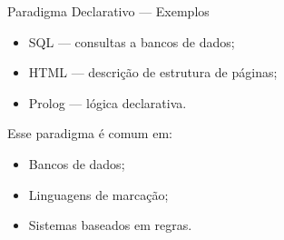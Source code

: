 \documentclass[9pt]{beamer}
\begin{document}
\begin{frame}{Paradigma Declarativo — Exemplos}
\begin{itemize}
  \item SQL — consultas a bancos de dados;
  \item HTML — descrição de estrutura de páginas;
  \item Prolog — lógica declarativa.
\end{itemize}

Esse paradigma é comum em:
\begin{itemize}
  \item Bancos de dados;
  \item Linguagens de marcação;
  \item Sistemas baseados em regras.
\end{itemize}
\end{frame}
\end{document}
